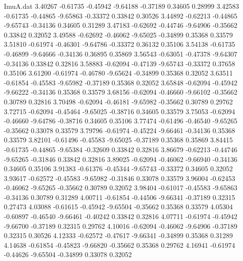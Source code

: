 \begin{filecontents}{ImuA.dat}
   3.40267   -0.61735   -0.45942   -9.64188   -0.37189    0.34605    0.28999
   3.42583   -0.61735   -0.44865   -9.65863   -0.33372    0.33842    0.30526
   3.44892   -0.62213   -0.44865   -9.65743   -0.34136    0.34605    0.31289
   3.47183   -0.62692   -0.44746   -9.64906   -0.35662    0.33842    0.32052
   3.49588   -0.62692   -0.46062   -9.65025   -0.34899    0.35368    0.33579
   3.51810   -0.61974   -0.46301   -9.64786   -0.33372    0.36132    0.35106
   3.54138   -0.61735   -0.46899   -9.64666   -0.34136    0.36895    0.35869
   3.56543   -0.63051   -0.47378   -9.64307   -0.34136    0.33842    0.32816
   3.58883   -0.62094   -0.47139   -9.65743   -0.33372    0.37658    0.35106
   3.61200   -0.61974   -0.46780   -9.65624   -0.34899    0.35368    0.32052
   3.63511   -0.61854   -0.45583   -9.65982   -0.37189    0.35368    0.32052
   3.65848   -0.62094   -0.45942   -9.66222   -0.34136    0.35368    0.33579
   3.68156   -0.62094   -0.46660   -9.66102   -0.35662    0.30789    0.32816
   3.70498   -0.62094   -0.46181   -9.65982   -0.35662    0.30789    0.29762
   3.72715   -0.62094   -0.45464   -9.65025   -0.38716    0.34605    0.33579
   3.75053   -0.62094   -0.46660   -9.64786   -0.38716    0.34605    0.35106
   3.77474   -0.61496   -0.46540   -9.65265   -0.35662    0.33078    0.33579
   3.79796   -0.61974   -0.45224   -9.66461   -0.34136    0.35368    0.33579
   3.82101   -0.61496   -0.45583   -9.65025   -0.37189    0.35368    0.35869
   3.84415   -0.61735   -0.44865   -9.65384   -0.32609    0.33842    0.32816
   3.86679   -0.62213   -0.44746   -9.65265   -0.31846    0.33842    0.32816
   3.89025   -0.62094   -0.46062   -9.66940   -0.34136    0.34605    0.35106
   3.91383   -0.61376   -0.45344   -9.65743   -0.33372    0.34605    0.32052
   3.93617   -0.62572   -0.45583   -9.65982   -0.31846    0.33078    0.33579
   3.96004   -0.62453   -0.46062   -9.65265   -0.35662    0.30789    0.32052
   3.98404   -0.61017   -0.45583   -9.65863   -0.34136    0.30789    0.31289
   4.00711   -0.61854   -0.44506   -9.66341   -0.37189    0.32315    0.27473
   4.03088   -0.61615   -0.45942   -9.65504   -0.35662    0.35368    0.33579
   4.05304   -0.60897   -0.46540   -9.66461   -0.40242    0.33842    0.32816
   4.07711   -0.61974   -0.45942   -9.66700   -0.37189    0.32315    0.29762
   4.10016   -0.62094   -0.46062   -9.64906   -0.37189    0.32315    0.30526
   4.12333   -0.62572   -0.47617   -9.66341   -0.34899    0.35368    0.31289
   4.14638   -0.61854   -0.45823   -9.66820   -0.35662    0.35368    0.29762
   4.16941   -0.61974   -0.44626   -9.65504   -0.34899    0.33078    0.32052

\end{filecontents}
